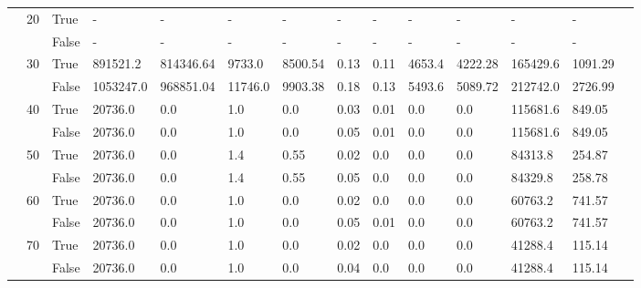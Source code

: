 \begin{landscape}
\begin{small}
\begin{longtable}[c]{@{}lll|ll|ll|ll|ll|lll@{}}
   & 20 & True  & -               & -              & -             & -             & -             & -             & -             & -             & -             & -           &  \\
   &    & False & -               & -              & -             & -             & -             & -             & -             & -             & -             & -           &  \\
   & 30 & True  & 891521.2        & 814346.64      & 9733.0        & 8500.54       & 0.13          & 0.11          & 4653.4        & 4222.28       & 165429.6      & 1091.29     &  \\
   &    & False & 1053247.0       & 968851.04      & 11746.0       & 9903.38       & 0.18          & 0.13          & 5493.6        & 5089.72       & 212742.0      & 2726.99     &  \\
   & 40 & True  & 20736.0         & 0.0            & 1.0           & 0.0           & 0.03          & 0.01          & 0.0           & 0.0           & 115681.6      & 849.05      &  \\
   &    & False & 20736.0         & 0.0            & 1.0           & 0.0           & 0.05          & 0.01          & 0.0           & 0.0           & 115681.6      & 849.05      &  \\
   & 50 & True  & 20736.0         & 0.0            & 1.4           & 0.55          & 0.02          & 0.0           & 0.0           & 0.0           & 84313.8       & 254.87      &  \\
   &    & False & 20736.0         & 0.0            & 1.4           & 0.55          & 0.05          & 0.0           & 0.0           & 0.0           & 84329.8       & 258.78      &  \\
   & 60 & True  & 20736.0         & 0.0            & 1.0           & 0.0           & 0.02          & 0.0           & 0.0           & 0.0           & 60763.2       & 741.57      &  \\
   &    & False & 20736.0         & 0.0            & 1.0           & 0.0           & 0.05          & 0.01          & 0.0           & 0.0           & 60763.2       & 741.57      &  \\
   & 70 & True  & 20736.0         & 0.0            & 1.0           & 0.0           & 0.02          & 0.0           & 0.0           & 0.0           & 41288.4       & 115.14      &  \\
   &    & False & 20736.0         & 0.0            & 1.0           & 0.0           & 0.04          & 0.0           & 0.0           & 0.0           & 41288.4       & 115.14      &  \\

\end{longtable}
\end{small}
\end{landscape}
